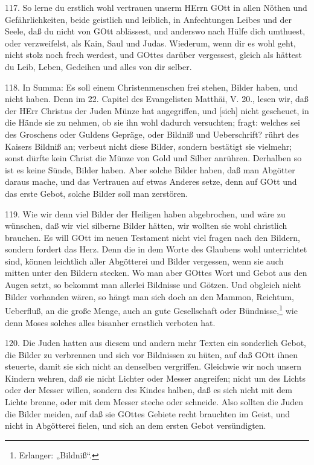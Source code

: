 117. So lerne du erstlich wohl vertrauen unserm HErrn GOtt in allen Nöthen und Gefährlichkeiten, beide geistlich und leiblich, in Anfechtungen Leibes und der Seele, daß du nicht von GOtt ablässest, und anderswo nach Hülfe dich umthuest, oder verzweifelst, als Kain, Saul und Judas. Wiederum, wenn dir es wohl geht, nicht stolz noch frech werdest, und GOttes darüber vergessest, gleich als hättest du Leib, Leben, Gedeihen und alles von dir selber.

118. In Summa: Es soll einem Christenmenschen frei stehen, Bilder haben, und nicht haben. Denn im 22. Capitel des Evangelisten Matthäi, V. 20., lesen wir, daß der HErr Christus der Juden Münze hat angegriffen, und [sich] nicht gescheuet, in die Hände sie zu nehmen, ob sie ihn wohl dadurch versuchten; fragt: welches sei des Groschens oder Guldens Gepräge, oder Bildniß und Ueberschrift? rührt des Kaisers Bildniß an; verbeut nicht diese Bilder, sondern bestätigt sie vielmehr; sonst dürfte kein Christ die Münze von Gold und Silber anrühren. Derhalben so ist es keine Sünde, Bilder haben. Aber solche Bilder haben, daß man Abgötter daraus mache, und das Vertrauen auf etwas Anderes setze, denn auf GOtt und das erste Gebot, solche Bilder soll man zerstören.

119. Wie wir denn viel Bilder der Heiligen haben abgebrochen, und wäre zu wünschen, daß wir viel silberne Bilder hätten, wir wollten sie wohl christlich brauchen. Es will GOtt im neuen Testament nicht viel fragen nach den Bildern, sondern fordert das Herz. Denn die in dem Worte des Glaubens wohl unterrichtet sind, können leichtlich aller Abgötterei und Bilder vergessen, wenn sie auch mitten unter den Bildern stecken. Wo man aber GOttes Wort und Gebot aus den Augen setzt, so bekommt man allerlei Bildnisse und Götzen. Und obgleich nicht Bilder vorhanden wären, so hängt man sich doch an den Mammon, Reichtum, Ueberfluß, an die große Menge, auch an gute Gesellschaft oder Bündnisse,\footnote{Erlanger: „Bildniß“.} wie denn Moses solches alles bisanher ernstlich verboten hat.

120. Die Juden hatten aus diesem und andern mehr Texten ein sonderlich Gebot, die Bilder zu verbrennen und sich vor Bildnissen zu hüten, auf daß GOtt ihnen steuerte, damit sie
sich nicht an denselben vergriffen. Gleichwie wir noch unsern Kindern wehren, daß sie nicht Lichter oder Messer angreifen; nicht um des Lichts oder der Messer willen, sondern des Kindes halben, daß es sich nicht mit dem Lichte brenne, oder mit dem Messer steche oder schneide. Also sollten die Juden die Bilder meiden, auf daß sie GOttes Gebiete recht brauchten im Geist, und nicht in Abgötterei fielen, und sich an dem ersten Gebot versündigten.

